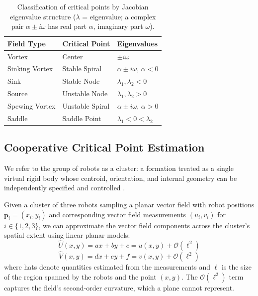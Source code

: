 \documentclass[lettersize,journal]{IEEEtran}
\begin{document}
\begin{table}[!t]
    \centering
    \caption{Classification of critical points by Jacobian eigenvalue structure ($\lambda$ = eigenvalue; a complex pair $\alpha \pm i\omega$ has real part $\alpha$, imaginary part $\omega$).}
    \label{tab:field_summary}
    \footnotesize
    \setlength{\tabcolsep}{2pt}
    \begin{tabular}{lll}
    \hline
    \textbf{Field Type} & \textbf{Critical Point} & \textbf{Eigenvalues} \\
    \hline
    Vortex & Center & $\pm i\omega$ \\
    Sinking Vortex & Stable Spiral & $\alpha \pm i\omega$, $\alpha < 0$ \\
    Sink & Stable Node & $\lambda_1, \lambda_2 < 0$ \\
    Source & Unstable Node & $\lambda_1, \lambda_2 > 0$ \\
    Spewing Vortex & Unstable Spiral & $\alpha \pm i\omega$, $\alpha > 0$ \\
    Saddle & Saddle Point & $\lambda_1 < 0 < \lambda_2$ \\
    \hline
    \end{tabular}
\end{table}


\subsection{Cooperative Critical Point Estimation}
\noindent

We refer to the group of robots as a cluster: a formation treated as a single virtual rigid body whose centroid, orientation, and internal geometry can be independently specified and controlled \cite{50,51}.

Given a cluster of three robots sampling a planar vector field with robot positions $\mathbf{p}_i = (x_i, y_i)$ and corresponding vector field measurements $(u_i, v_i)$ for $i \in \{1, 2, 3\}$, we can approximate the vector field components across the cluster's spatial extent using linear planar models:
\begin{equation}\label{eq:2}
\hat{U}(x,y) = ax + by + c = u(x,y) + \mathcal{O}(\ell^2)
\end{equation}
\begin{equation}\label{eq:3}
\hat{V}(x,y) = dx + ey + f = v(x,y) + \mathcal{O}(\ell^2)
\end{equation}
where hats denote quantities estimated from the measurements and $\ell$ is the size of the region spanned by the robots and the point $(x,y)$. The $\mathcal{O}(\ell^2)$ term captures the field's second-order curvature, which a plane cannot represent.
\end{document}
